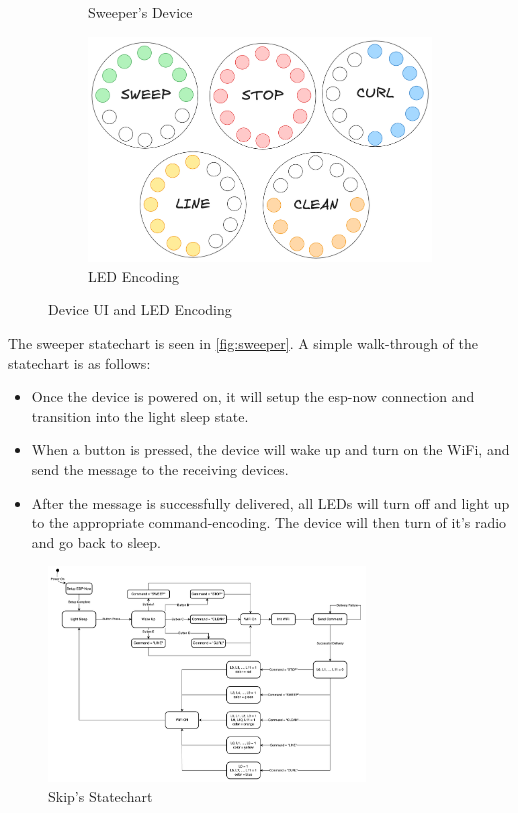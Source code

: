 \documentclass{article}
\begin{document}
\begin{figure}[ht!]
\begin{subfigure}{0.2\textwidth}
        \caption{Sweeper's Device}
    \end{subfigure}
    \begin{subfigure}{0.35\textwidth}
        \centering
        \includegraphics[width=\textwidth]{msg_encoding.png}
        \caption{LED Encoding}
    \end{subfigure}
    \caption{Device UI and LED Encoding}
    \label{fig:main_interface}
\end{figure}

The sweeper statechart is seen in \autoref{fig:sweeper}. A simple walk-through of the statechart is as follows:
\begin{itemize}
    \item Once the device is powered on, it will setup the esp-now connection and transition into the light sleep state.
    \item When a button is pressed, the device will wake up and turn on the WiFi, and send the message to the receiving devices.
    \item After the message is successfully delivered, all LEDs will turn off and light up to the appropriate command-encoding. The device will then turn of it's radio and go back to sleep.
\end{itemize}

\begin{figure}[ht!]
    \centering
    \includegraphics[width=0.75\textwidth]{skip statechart.png}
    \caption{Skip's Statechart}
    \label{fig:sweeper}
\end{figure}
\end{document}
